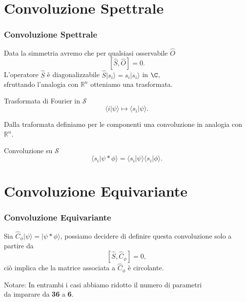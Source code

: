 \documentclass[xcolor=dvipsnames]{beamer}
\newcommand{\R}{\mathbb{R}}
\newcommand{\mc}[1]{\mathcal{#1}}
\begin{document}
\section{Convoluzione Spettrale}

\begin{frame}
    \frametitle{Convoluzione Spettrale}
    Data la simmetria avremo che per qualsiasi osservabile $\widehat{O}$
    \[ [\widehat{S}, \widehat{O}] = 0 . \]
    L'operatore $\widehat{S}$ è diagonalizzabile $\widehat{S} |s_i \rangle = s_i | s_i \rangle$ in $\C$,\\ sfruttando l'analogia con $\R^n$ otteniamo una trasformata.
    \begin{block}{Trasformata di Fourier in $\mc{S}$}
        \[ \langle i | \psi \rangle \mapsto \langle s_i | \psi \rangle. \]
    \end{block}
    Dalla traformata definiamo per le componenti una convoluzione in analogia con $\R^n$.
    \begin{block}{Convoluzione su $\mc{S}$}
        \[ \langle s_i | \psi * \phi \rangle = \langle s_i | \psi \rangle \langle s_i | \phi \rangle . \]
    \end{block}   
\end{frame}

\section{Convoluzione Equivariante}

\begin{frame}
    \frametitle{Convoluzione Equivariante}
    Sia $\widehat{C}_\phi | \psi \rangle = | \psi * \phi \rangle$, possiamo decidere di definire questa convoluzione solo a partire da
    \[ [\widehat{S}, \widehat{C}_\phi] = 0, \]
    ciò implica che la matrice associata a $\widehat{C}_\phi$ è circolante.

    \begin{block}{Notare:}
        In entrambi i casi abbiamo ridotto il numero di parametri \\ da imparare da \textbf{36} a \textbf{6}.
    \end{block}
\end{frame}
\end{document}
